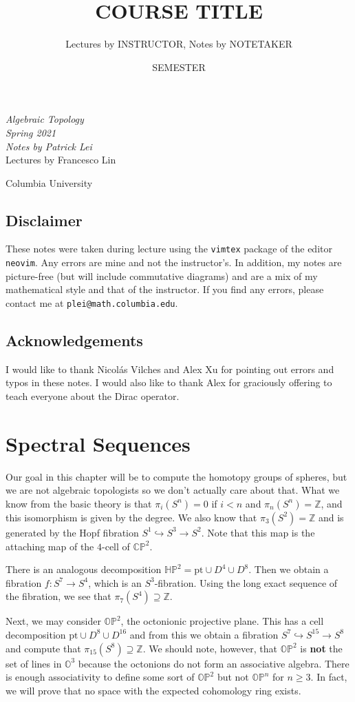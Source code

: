 \documentclass[leqno, openany]{memoir}
\title{COURSE TITLE}
\author{Lectures by INSTRUCTOR, Notes by NOTETAKER}
\date{SEMESTER}
\theoremstyle{definition}
\theoremstyle{remark}
\theoremstyle{plain}
\theoremstyle{definition}
\theoremstyle{remark}
\renewcommand{\H}{\mathbb{H}}
\newcommand{\C}{\mathbb{C}}
\newcommand{\Z}{\mathbb{Z}}
\renewcommand{\P}{\mathbb{P}}
\newcommand{\mr}[1]{\mathrm{#1}}
\newcommand*{\titleSW}
    {\begingroup%
    \raggedleft
    \vspace*{\baselineskip}
    {\Huge\itshape Algebraic Topology \\ Spring 2021}\\[\baselineskip]
    {\large\itshape Notes by Patrick Lei}\\[0.2\textheight]
    {\Large Lectures by Francesco Lin}\par
    \vfill
    {\Large \sffamily Columbia University}
    \vspace*{\baselineskip}
\endgroup}
\begin{document}
    
\begin{titlingpage}
\titleSW
\end{titlingpage}

\thispagestyle{empty}
\section*{Disclaimer}%
\label{sec:disclaimer}

These notes were taken during lecture using the \texttt{vimtex} package of the
editor \texttt{neovim}.  Any errors are mine and not the instructor's.  In
addition, my notes are picture-free (but will include commutative diagrams) and
are a mix of my mathematical style and that of the instructor.  If you find any
errors, please contact me at \texttt{plei@math.columbia.edu}.

\section*{Acknowledgements}%

I would like to thank Nicol\'as Vilches and Alex Xu for pointing out errors and
typos in these notes. I would also like to thank Alex for graciously offering
to teach everyone about the Dirac operator. 


\newpage


\tableofcontents

\chapter{Spectral Sequences}%

Our goal in this chapter will be to compute the homotopy groups of spheres, but
we are not algebraic topologists so we don't actually care about that. What we
know from the basic theory is that $\pi_i(S^n) = 0$ if $i < n$ and $\pi_n(S^n)
= \Z$, and this isomorphism is given by the degree. We also know that
$\pi_3(S^2) = \Z$ and is generated by the Hopf fibration $S^1 \hookrightarrow
S^3 \to S^2$. Note that this map is the attaching map of the $4$-cell of
$\C\P^2$.

There is an analogous decomposition $\H\P^2 = \mr{pt} \cup D^4 \cup D^8$. Then
we obtain a fibration $f \colon S^7 \to S^4$, which is an $S^3$-fibration.
Using the long exact sequence of the fibration, we see that $\pi_7(S^4)
\supseteq \Z$.

Next, we may consider $\mathbb{O}\P^2$, the octonionic projective plane. This
has a cell decomposition $\mr{pt} \cup D^8 \cup D^{16}$ and from this we obtain
a fibration $S^7 \hookrightarrow S^{15} \to S^8$ and compute that
$\pi_{15}(S^8) \supseteq \Z$. We should note, however, that $\mathbb{O}\P^2$ is
\textbf{not} the set of lines in $\mathbb{O}^3$ because the octonions do not
form an associative algebra. There is enough associativity to define some sort
of $\mathbb{O}\P^2$ but not $\mathbb{O}\P^n$ for $n \geq 3$. In fact, we will
prove that no space with the expected cohomology ring exists.
\end{document}
